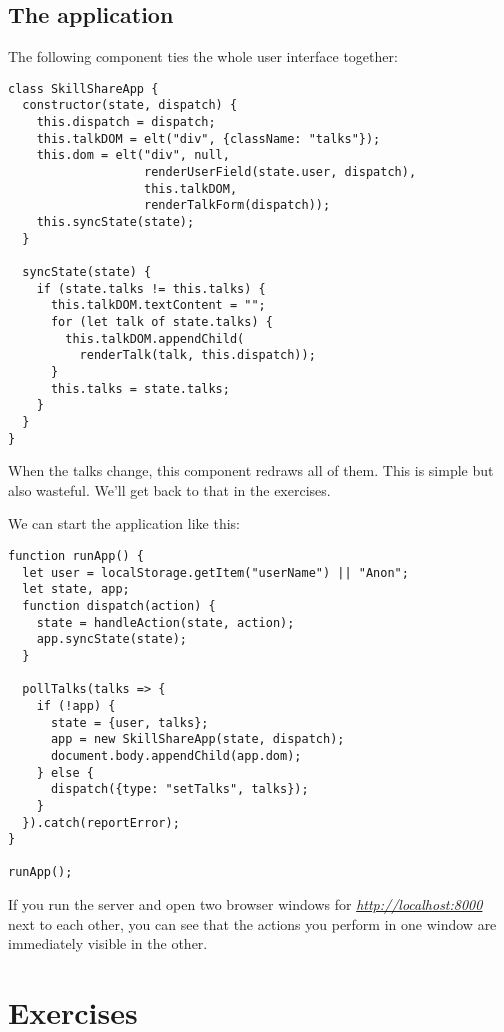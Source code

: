 \subsection{The application}

The following component ties the whole user interface together:

\begin{lstlisting}
class SkillShareApp {
  constructor(state, dispatch) {
    this.dispatch = dispatch;
    this.talkDOM = elt("div", {className: "talks"});
    this.dom = elt("div", null,
                   renderUserField(state.user, dispatch),
                   this.talkDOM,
                   renderTalkForm(dispatch));
    this.syncState(state);
  }

  syncState(state) {
    if (state.talks != this.talks) {
      this.talkDOM.textContent = "";
      for (let talk of state.talks) {
        this.talkDOM.appendChild(
          renderTalk(talk, this.dispatch));
      }
      this.talks = state.talks;
    }
  }
}
\end{lstlisting}
\noindent{}

When the talks change, this component redraws all of them. This is simple but also wasteful. We'll get back to that in the exercises.

We can start the application like this:

\begin{lstlisting}
function runApp() {
  let user = localStorage.getItem("userName") || "Anon";
  let state, app;
  function dispatch(action) {
    state = handleAction(state, action);
    app.syncState(state);
  }

  pollTalks(talks => {
    if (!app) {
      state = {user, talks};
      app = new SkillShareApp(state, dispatch);
      document.body.appendChild(app.dom);
    } else {
      dispatch({type: "setTalks", talks});
    }
  }).catch(reportError);
}

runApp();
\end{lstlisting}
\noindent

If you run the server and open two browser windows for \href{http://localhost:8000/}{\emph{http://localhost:8000}} next to each other, you can see that the actions you perform in one window are immediately visible in the other.

\section{Exercises}

